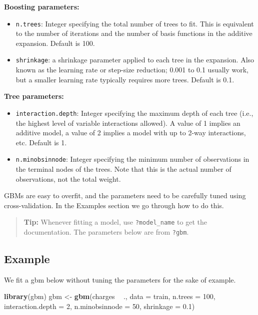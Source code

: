 \documentclass[openany]{book}
\newenvironment{Shaded}{\begin{snugshade}}{\end{snugshade}}
\newcommand{\DataTypeTok}[1]{\textcolor[rgb]{0.13,0.29,0.53}{#1}}
\newcommand{\DecValTok}[1]{\textcolor[rgb]{0.00,0.00,0.81}{#1}}
\newcommand{\FloatTok}[1]{\textcolor[rgb]{0.00,0.00,0.81}{#1}}
\newcommand{\KeywordTok}[1]{\textcolor[rgb]{0.13,0.29,0.53}{\textbf{#1}}}
\newcommand{\NormalTok}[1]{#1}
\newcommand{\OperatorTok}[1]{\textcolor[rgb]{0.81,0.36,0.00}{\textbf{#1}}}
\newcommand{\StringTok}[1]{\textcolor[rgb]{0.31,0.60,0.02}{#1}}
\begin{document}
\textbf{Boosting parameters:}

\begin{itemize}
\item
  \texttt{n.trees}: Integer specifying the total number of trees to fit. This is equivalent to the number of iterations and the number of basis functions in the additive expansion. Default is 100.
\item
  \texttt{shrinkage}: a shrinkage parameter applied to each tree in the expansion. Also known as the learning rate or step-size reduction; 0.001 to 0.1 usually work, but a smaller learning rate typically requires more trees. Default is 0.1.
\end{itemize}

\textbf{Tree parameters:}

\begin{itemize}
\item
  \texttt{interaction.depth}: Integer specifying the maximum depth of each tree (i.e., the highest level of variable interactions allowed). A value of 1 implies an additive model, a value of 2 implies a model with up to 2-way interactions, etc. Default is 1.
\item
  \texttt{n.minobsinnode}: Integer specifying the minimum number of observations in the terminal nodes of the trees. Note that this is the actual number of observations, not the total weight.
\end{itemize}

GBMs are easy to overfit, and the parameters need to be carefully tuned using cross-validation. In the Examples section we go through how to do this.

\begin{quote}
\textbf{Tip:} Whenever fitting a model, use \texttt{?model\_name} to get the documentation. The parameters below are from \texttt{?gbm}.
\end{quote}

\hypertarget{example-4}{%
\subsection{Example}\label{example-4}}

We fit a gbm below without tuning the parameters for the sake of example.

\begin{Shaded}
\begin{Highlighting}[]
\KeywordTok{library}\NormalTok{(gbm)}
\NormalTok{gbm <-}\StringTok{ }\KeywordTok{gbm}\NormalTok{(charges }\OperatorTok{~}\StringTok{ }\NormalTok{., }\DataTypeTok{data =}\NormalTok{ train,}
           \DataTypeTok{n.trees =} \DecValTok{100}\NormalTok{,}
           \DataTypeTok{interaction.depth =} \DecValTok{2}\NormalTok{,}
           \DataTypeTok{n.minobsinnode =} \DecValTok{50}\NormalTok{,}
           \DataTypeTok{shrinkage =} \FloatTok{0.1}\NormalTok{)}
\end{Highlighting}
\end{Shaded}
\end{document}
